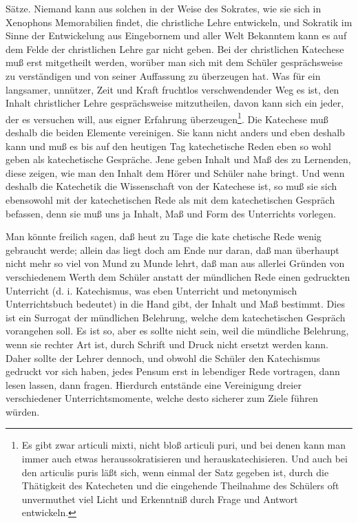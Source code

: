 Sätze. Niemand kann aus solchen in der Weise des Sokrates, wie sie sich in Xenophons Memorabilien findet, die christliche Lehre entwickeln, und Sokratik im Sinne der Entwickelung aus Eingebornem und aller Welt Bekanntem kann es auf dem Felde der christlichen Lehre gar nicht geben. Bei der christlichen Katechese muß erst mitgetheilt werden, worüber man sich mit dem Schüler gesprächsweise zu verständigen und von seiner Auffassung zu überzeugen hat. Was für ein langsamer, unnützer, Zeit und Kraft fruchtlos verschwendender Weg es ist, den Inhalt christlicher Lehre gesprächsweise mitzutheilen, davon kann sich ein jeder, der es versuchen will, aus eigner Erfahrung überzeugen\footnote{Es gibt zwar articuli mixti, nicht bloß articuli puri, und bei denen kann man immer auch etwas heraussokratisieren und herauskatechisieren. Und auch bei den articulis puris läßt sich, wenn einmal der Satz gegeben ist, durch die Thätigkeit des Katecheten und die eingehende Theilnahme des Schülers oft unvermuthet viel Licht und Erkenntniß durch Frage und Antwort entwickeln.}. Die Katechese muß deshalb die beiden Elemente vereinigen. Sie kann nicht anders und eben deshalb kann und muß es bis auf den heutigen Tag katechetische Reden eben so wohl geben als katechetische Gespräche. Jene geben Inhalt und Maß des zu Lernenden, diese zeigen, wie man den Inhalt dem Hörer und Schüler nahe bringt. Und wenn deshalb die Katechetik die Wissenschaft von der Katechese ist, so muß sie sich ebensowohl mit der katechetischen Rede als mit dem katechetischen Gespräch befassen, denn sie muß uns ja Inhalt, Maß und Form des Unterrichts vorlegen.

Man könnte freilich sagen, daß heut zu Tage die kate%
chetische Rede wenig gebraucht werde; allein das liegt doch am Ende nur daran, daß man überhaupt nicht mehr so viel von Mund zu Munde lehrt, daß man aus allerlei Gründen von verschiedenem Werth dem Schüler anstatt der mündlichen Rede einen gedruckten Unterricht (d. i. Katechismus, was eben Unterricht und metonymisch Unterrichtsbuch bedeutet) in die Hand gibt, der Inhalt und Maß bestimmt. Dies ist ein Surrogat der mündlichen Belehrung, welche dem katechetischen Gespräch vorangehen soll. Es ist so, aber es sollte nicht sein, weil die mündliche Belehrung, wenn sie rechter Art ist, durch Schrift und Druck nicht ersetzt werden kann. Daher sollte der Lehrer dennoch, und obwohl die Schüler den Katechismus gedruckt vor sich haben, jedes Pensum erst in lebendiger Rede vortragen, dann lesen lassen, dann fragen. Hierdurch entstände eine Vereinigung dreier verschiedener Unterrichtsmomente, welche desto sicherer zum Ziele führen würden.

